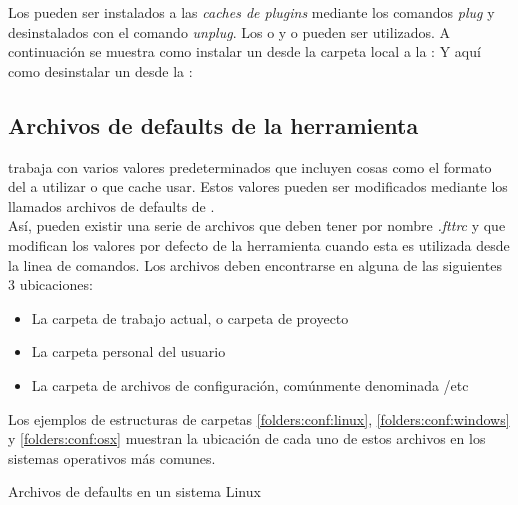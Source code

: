 Los \plugins pueden ser instalados a las \emph{caches de plugins} mediante los 
comandos \emph{plug} y desinstalados con el comando \emph{unplug}. Los \flags
{} o  y  o  pueden ser 
utilizados. A continuación se muestra como instalar un \plugin desde la carpeta 
local a la \plugincacheg:
Y aquí como desinstalar un \plugin desde la \plugincachel:

\subsection{Archivos de defaults de la herramienta}
\label{subsec:guide:conffiles}

\fronttier trabaja con varios valores predeterminados que incluyen cosas como el
formato del \conffile a utilizar o que cache usar. Estos valores pueden ser 
modificados mediante los llamados archivos de defaults de \fronttier.\\
Así, pueden existir una serie de archivos que deben tener por nombre 
\emph{.fttrc} y que modifican los valores por defecto de la herramienta cuando 
esta es utilizada desde la linea de comandos. Los archivos deben encontrarse en 
alguna de las siguientes 3 ubicaciones:

\begin{itemize}
	\setlength{\itemsep}{1pt}
	\setlength{\parskip}{0pt}
	\setlength{\parsep}{0pt}
	\item La carpeta de trabajo actual, o carpeta de proyecto
	\item La carpeta personal del usuario
	\item La carpeta de archivos de configuración, comúnmente denominada /etc
\end{itemize}

Los ejemplos de estructuras de carpetas \ref{folders:conf:linux}, 
\ref{folders:conf:windows} y \ref{folders:conf:osx} muestran la ubicación de 
cada uno de estos archivos en los sistemas operativos más comunes.

\begin{folders}[h]
	\caption{Archivos de defaults en un sistema Linux}
	\label{folders:conf:linux}
\end{folders}

